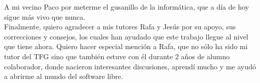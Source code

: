 \begin{dedicatoria}
	A mi vecino Paco por meterme el gusanillo de la informática, que a día de hoy sigue más vivo que nunca. \\
	
	Finalmente, quiero agradecer a mis tutores Rafa y Jesús por su apoyo, sus correcciones y consejos, los cuales han ayudado que este trabajo llegue al nivel que tiene ahora. Quiero hacer especial mención a Rafa, que no sólo ha sido mi tutor del TFG sino que también estuve con él durante 2 años de alumno colaborador, donde nacieron interesantes discusiones, aprendí mucho y me ayudó a abrirme al mundo del software libre.
	
\end{dedicatoria}